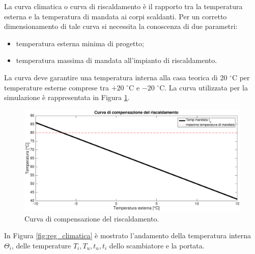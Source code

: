 \documentclass[laurea,oneside,11pt]{USiena_tesiLM3}
\begin{document}
La curva climatica o curva di riscaldamento è il rapporto tra la temperatura esterna e la temperatura di mandata ai corpi scaldanti. Per un corretto dimensionamento di tale curva si necessita la conoscenza di due parametri:
\begin{itemize}
\item temperatura esterna minima di progetto;
\item temperatura massima di mandata all'impianto di riscaldamento.
\end{itemize}

La curva deve garantire una temperatura interna alla casa teorica di 20 $^{\circ}$C  per temperature esterne comprese tra $+20$ $^{\circ}$C e $-20$ $^{\circ}$C. La curva  utilizzata per la simulazione è rappresentata in Figura \ref{fig:curva_comp}.
 
 \begin{figure}[!ht]
\centering
\includegraphics[width=\textwidth]{figure/curva_comp} 
\caption{Curva di compensazione del riscaldamento.}
\label{fig:curva_comp}
\end{figure}


In Figura \ref{fig:reg_climatica} è mostrato l'andamento della temperatura interna $\Theta_i$, delle temperature $T_i, T_u, t_u, t_i$ dello scambiatore e la portata.
\end{document}
